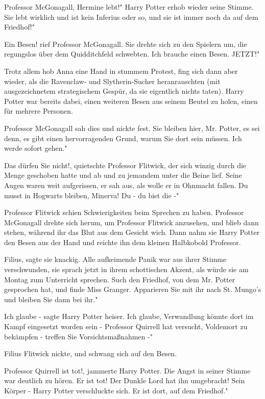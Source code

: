 \glqq{}Professor McGonagall, Hermine lebt!" Harry Potter erhob wieder seine
Stimme. \glqq{}Sie lebt wirklich und ist kein Inferius oder so, und sie ist immer
noch da auf dem Friedhof!"

\glqq{}Ein Besen!\grqq{} rief Professor McGonagall. Sie drehte sich zu den
Spielern um, die regungslos über dem Quidditchfeld schwebten. \glqq{}Ich brauche
einen Besen. JETZT!"

Trotz allem hob Anna eine Hand in stummem Protest, fing sich dann aber wieder,
als die Ravenclaw- und Slytherin-Sucher heranrauschten (mit ausgezeichnetem
strategischem Gespür, da sie eigentlich nichts taten). Harry Potter war bereits
dabei, einen weiteren Besen aus seinem Beutel zu holen, einen für mehrere
Personen.

Professor McGonagall sah dies und nickte fest. \glqq{}Sie bleiben hier, Mr.
Potter, es sei denn, es gibt einen hervorragenden Grund, warum Sie dort sein
müssen. Ich werde sofort gehen."

\glqq{}Das dürfen Sie nicht!\grqq{}, quietschte Professor Flitwick, der sich
winzig durch die Menge geschoben hatte und ab und zu jemandem unter die Beine
lief. Seine Augen waren weit aufgerissen, er sah aus, als wolle er in Ohnmacht
fallen. \glqq{}Du musst in Hogwarts bleiben, Minerva! Du - du bist die -"

Professor Flitwick schien Schwierigkeiten beim Sprechen zu haben. Professor
McGonagall drehte sich herum, um Professor Flitwick anzusehen, und blieb dann
stehen, während ihr das Blut aus dem Gesicht wich. Dann nahm sie Harry Potter
den Besen aus der Hand und reichte ihn dem kleinen Halbkobold Professor.

\glqq{}Filius\grqq{}, sagte sie knackig. Alle aufkeimende Panik war aus ihrer
Stimme verschwunden, sie sprach jetzt in ihrem schottischen Akzent, als würde
sie am Montag zum Unterricht sprechen. \glqq{}Such den Friedhof, von dem Mr.
Potter gesprochen hat, und finde Miss Granger. Apparieren Sie mit ihr nach St.
Mungo's und bleiben Sie dann bei ihr."

\glqq{}Ich glaube -\grqq{} sagte Harry Potter heiser. \glqq{}Ich glaube,
Verwandlung könnte dort im Kampf eingesetzt worden sein - Professor Quirrell hat
versucht, Voldemort zu bekämpfen - treffen Sie Vorsichtsmaßnahmen -"

Filius Flitwick nickte, und schwang sich auf den Besen.

\glqq{}Professor Quirrell ist tot!\grqq{}, jammerte Harry Potter. Die Angst in
seiner Stimme war deutlich zu hören. \glqq{}Er ist tot! Der Dunkle Lord hat ihn
umgebracht! Sein Körper -\grqq{} Harry Potter verschluckte sich. \glqq{}Er ist
dort, auf dem Friedhof."

